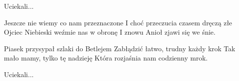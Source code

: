 \documentclass[../../../songbook.tex]{subfiles}
\begin{document}
\-\hspace{1cm}Uciekali...			\newline

Jeszcze nie wiemy co nam przeznaczone			\newline
I choć przeczucia czasem dręczą złe			\newline
Ojciec Niebieski weźmie nas w obronę			\newline
I znowu Anioł zjawi się we śnie.			\newline

Piasek przysypał szlaki do Betlejem			\newline
Zabłądzić łatwo, trudny każdy krok			\newline
Tak mało mamy, tylko tę nadzieję			\newline
Która rozjaśnia nam codzienny mrok.			\newline

\-\hspace{1cm}Uciekali...			\newline
\end{document}
